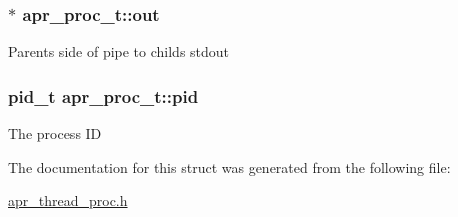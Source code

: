 \subsubsection[{\texorpdfstring{out}{out}}]{$\ast$ apr\+\_\+proc\+\_\+t\+::out}\hypertarget{structapr__proc__t_acb7d7c5226217946d761f0e90ff70d24}{}\label{structapr__proc__t_acb7d7c5226217946d761f0e90ff70d24}
Parent\textquotesingle{}s side of pipe to child\textquotesingle{}s stdout 
\subsubsection[{\texorpdfstring{pid}{pid}}]{\setlength{\rightskip}{0pt plus 5cm}pid\+\_\+t apr\+\_\+proc\+\_\+t\+::pid}\hypertarget{structapr__proc__t_a8a8ee4b234156485a72497023e7482e5}{}\label{structapr__proc__t_a8a8ee4b234156485a72497023e7482e5}
The process ID 

The documentation for this struct was generated from the following file\+:\begin{DoxyCompactItemize}
\item 
\hyperlink{apr__thread__proc_8h}{apr\+\_\+thread\+\_\+proc.\+h}\end{DoxyCompactItemize}
